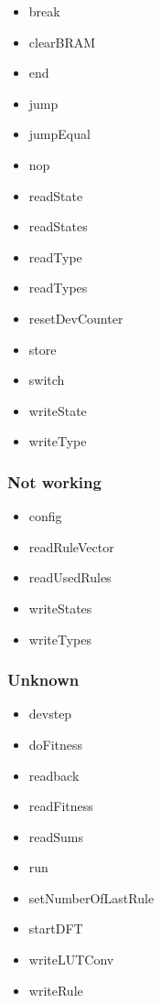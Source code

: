 \begin{itemize}
    \item break
    \item clearBRAM
    \item end
    \item jump
    \item jumpEqual
    \item nop
    \item readState
    \item readStates
    \item readType
    \item readTypes
    \item resetDevCounter
    \item store
    \item switch
    \item writeState
    \item writeType
\end{itemize}

\subsubsection{Not working}

\begin{itemize}
    \item config
    \item readRuleVector
    \item readUsedRules
    \item writeStates
    \item writeTypes
\end{itemize}

\subsubsection{Unknown}

\begin{itemize}
    \item devstep
    \item doFitness
    \item readback
    \item readFitness
    \item readSums
    \item run
    \item setNumberOfLastRule
    \item startDFT
    \item writeLUTConv
    \item writeRule
\end{itemize}

